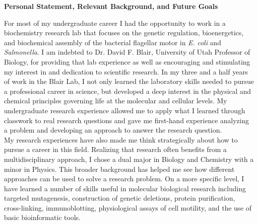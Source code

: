 \documentclass[12pt]{report}
\begin{document}
\begin{center}
{\bf Personal Statement, Relevant Background, and Future Goals}
\end{center}
\hspace{5mm} For most of my undergraduate career I had the opportunity to work in a biochemistry research lab that focuses on the genetic regulation, bioenergetics, and biochemical assembly of the bacterial flagellar motor in {\it E. coli} and {\it Salmonella}. I am indebted to Dr. David F. Blair, University of Utah Professor of Biology, for providing that lab experience as well as encouraging and stimulating my interest in and dedication to scientific research. In my three and a half years of work in the Blair Lab, I not only learned the laboratory skills needed to pursue a professional career in science, but developed a deep interest in the physical and chemical principles governing life at the molecular and cellular levels. My undergraduate research experience allowed me to apply what I learned through classwork to real research questions and gave me first-hand experience analyzing a problem and developing an approach to answer the research question.
\\
\indent My research experiences have also made me think strategically about how to pursue a career in this field. Realizing that research often benefits from a multidisciplinary approach, I chose a dual major in Biology and Chemistry with a minor in Physics. This broader background has helped me see how different approaches can be used to solve a research problem. On a more specific level, I have learned a number of skills useful in molecular biological research including targeted mutagenesis, construction of genetic deletions, protein purification, cross-linking, immunoblotting, physiological assays of cell motility, and the use of basic bioinformatic tools. 
\\
\end{document}
